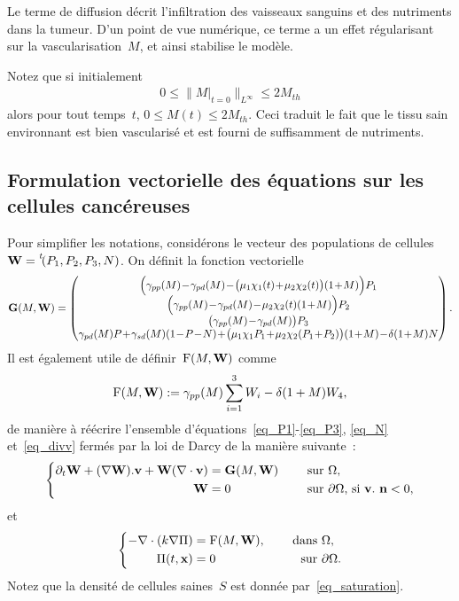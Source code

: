 \documentclass[11pt]{amsart}
\numberwithin{equation}{section}
\newcommand{\W}{{\bf W}}
\newcommand{\Frm}{{\rm F}}
\newcommand{\chiI}{\chi_1}
\newcommand{\chiS}{\chi_2}
\newcommand{\dive}{\nabla\cdot}
\newcommand{\muI}{\mu_1}
\newcommand{\muS}{\mu_2}
\newcommand{\muN}{\delta}
\newcommand{\nn}{{\bf n}}
\newcommand{\GG}{{\bf G}}
\newcommand{\trans}[1]{\prescript{\mathit{t\!}}{}{#1}}
\newcommand{\gammapp}{\gamma_{pp}}
\newcommand{\gammapd}{\gamma_{pd}}
\newcommand{\gammasd}{\gamma_{sd}}
\newcommand{\Ms}{M_{th}}
\newcommand{\vit}{\mathbf{v}}
\newcommand{\vecx}{\mathbf{x}}
\begin{document}
Le terme de diffusion décrit l'infiltration des vaisseaux sanguins et des nutriments dans la tumeur. D'un point de vue numérique, ce terme a un effet régularisant sur la vascularisation~$M$, et ainsi stabilise le modèle. 


Notez que si initialement 
\begin{align}\label{eq:borneM}
0\leq \|M|_{t=0}\|_{L^\infty}\leq 2\Ms
\end{align}
alors pour tout temps~$t$, $0\leq M(t) \leq 2\Ms$. Ceci traduit le fait que le tissu sain environnant est bien vascularisé et est fourni de suffisamment de nutriments.

\subsection{Formulation vectorielle des équations sur les cellules cancéreuses}

Pour simplifier les notations, considérons le vecteur des populations de cellules~$\W=\trans{(P_1, P_2, P_3, N)}$. On définit la fonction vectorielle 
$$
\medmuskip=1mu
\GG(M,\W) = \begin{pmatrix}
\Big(\gammapp(M)- \gammapd(M) - \big(\muI \chiI (t)+\muS \chiS(t) \big)(1+M)\Big) P_1 \\
\Big(\gammapp(M)- \gammapd(M) - \muS \chiS(t) (1+M)\Big)P_2 \\
\big(\gammapp(M) - \gammapd(M) \big)P_3 \\
\gammapd(M) P +\gammasd(M) (1-P-N)  + \big( \muI \chiI P_1 + \muS\chiS (P_1+P_2) \big) (1+M) - \muN(1+M)N
\end{pmatrix}.
$$
Il est également utile de définir~$\Frm(M,\W)$ comme
\begin{align}
  \label{eq_F}
  \Frm(M,\W):=\gammapp(M)\sum_{i=1}^3W_i-\muN(1+M)W_4,
\end{align}
de manière à réécrire l'ensemble d'équations~\eqref{eq_P1}-\eqref{eq_P3}, \eqref{eq_N} et~\eqref{eq_divv} fermés par la loi de Darcy de la manière suivante~:
\begin{equation}\label{eq_transport_pop}
\left\{
\begin{aligned}
\partial_t \W + (\nabla \W).\vit + \W (\dive \vit) &= \GG(M,\W) & \quad \textrm{ sur } & \Omega, \\
\W &=0 & \quad \textrm{ sur } & \partial \Omega \textrm{, si } \vit.\ \nn<0 ,
\end{aligned}
\right.
\end{equation}
et
\begin{equation}
\left\{ \begin{aligned}
 \label{eq_pression}
 -\dive\left(k\nabla \Pi\right) &=\Frm(M,\W), &\quad \textrm{ dans } & \Omega , \\
    \Pi(t,\vecx) &=0 & \quad \textrm{ sur  }& \partial \Omega.
\end{aligned}
\right. \end{equation}
Notez que la densité de cellules saines~$S$ est donnée par~\eqref{eq_saturation}.
\end{document}

